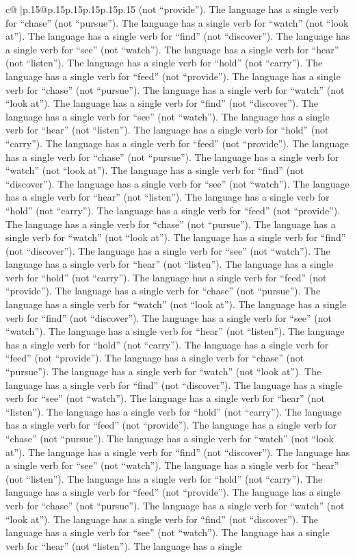 \documentclass{article}
\begin{document}
{\begin{supertabular}{c@{$\;$}|p{.15\linewidth}@{}p{.15\linewidth}p{.15\linewidth}p{.15\linewidth}p{.15\linewidth}p{.15\linewidth}}
{{{(not “provide”). The language has a single verb for “chase” (not “pursue”). The language has a single verb for “watch” (not “look at”). The language has a single verb for “find” (not “discover”). The language has a single verb for “see” (not “watch”). The language has a single verb for “hear” (not “listen”). The language has a single verb for “hold” (not “carry”). The language has a single verb for “feed” (not “provide”). The language has a single verb for “chase” (not “pursue”). The language has a single verb for “watch” (not “look at”). The language has a single verb for “find” (not “discover”). The language has a single verb for “see” (not “watch”). The language has a single verb for “hear” (not “listen”). The language has a single verb for “hold” (not “carry”). The language has a single verb for “feed” (not “provide”). The language has a single verb for “chase” (not “pursue”). The language has a single verb for “watch” (not “look at”). The language has a single verb for “find” (not “discover”). The language has a single verb for “see” (not “watch”). The language has a single verb for “hear” (not “listen”). The language has a single verb for “hold” (not “carry”). The language has a single verb for “feed” (not “provide”). The language has a single verb for “chase” (not “pursue”). The language has a single verb for “watch” (not “look at”). The language has a single verb for “find” (not “discover”). The language has a single verb for “see” (not “watch”). The language has a single verb for “hear” (not “listen”). The language has a single verb for “hold” (not “carry”). The language has a single verb for “feed” (not “provide”). The language has a single verb for “chase” (not “pursue”). The language has a single verb for “watch” (not “look at”). The language has a single verb for “find” (not “discover”). The language has a single verb for “see” (not “watch”). The language has a single verb for “hear” (not “listen”). The language has a single verb for “hold” (not “carry”). The language has a single verb for “feed” (not “provide”). The language has a single verb for “chase” (not “pursue”). The language has a single verb for “watch” (not “look at”). The language has a single verb for “find” (not “discover”). The language has a single verb for “see” (not “watch”). The language has a single verb for “hear” (not “listen”). The language has a single verb for “hold” (not “carry”). The language has a single verb for “feed” (not “provide”). The language has a single verb for “chase” (not “pursue”). The language has a single verb for “watch” (not “look at”). The language has a single verb for “find” (not “discover”). The language has a single verb for “see” (not “watch”). The language has a single verb for “hear” (not “listen”). The language has a single verb for “hold” (not “carry”). The language has a single verb for “feed” (not “provide”). The language has a single verb for “chase” (not “pursue”). The language has a single verb for “watch” (not “look at”). The language has a single verb for “find” (not “discover”). The language has a single verb for “see” (not “watch”). The language has a single verb for “hear” (not “listen”). The language has a single }}}
\end{supertabular}}
\end{document}
